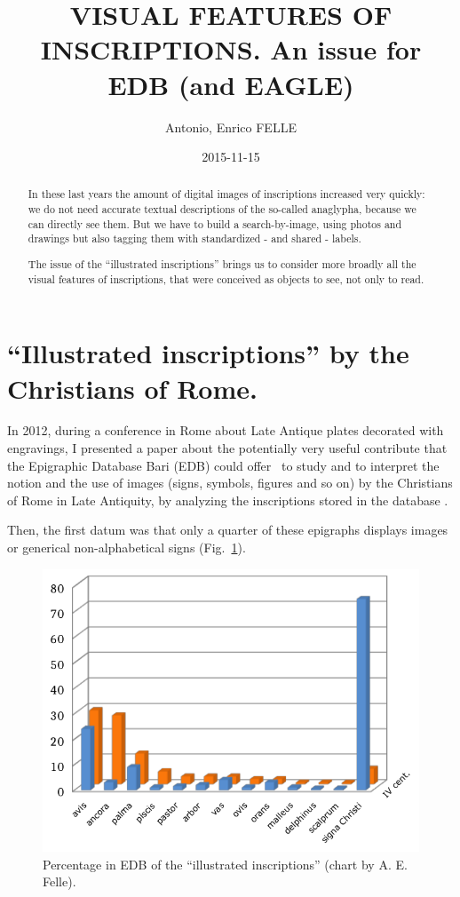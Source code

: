 \documentclass[amsthm,ebook]{saparticle}
\title{VISUAL FEATURES OF INSCRIPTIONS. An issue for EDB (and EAGLE)}
\author[uniba]{Antonio, Enrico FELLE\corref{first}}
\date{2015-11-15}
\begin{document}
\maketitle
\begin{abstract}
In these last years the amount of digital images of inscriptions increased very quickly: we do not need accurate textual
descriptions of the so-called anaglypha, because we can directly see them. But we have to build a search-by-image,
using photos and drawings but also tagging them with standardized - and shared - labels. 

The issue of the ``illustrated inscriptions'' brings us to consider more broadly all the
visual features of inscriptions, that were conceived as objects to see, not only to read.
\end{abstract}




\section{``Illustrated inscriptions'' by the Christians of Rome.}
\noindent In 2012, during a conference in Rome about Late Antique plates decorated with engravings, I presented a paper about the
potentially very useful contribute that the Epigraphic Database Bari (EDB) could offer \ to study and to interpret the
notion and the use of images (signs, symbols, figures and so on) by the Christians of Rome in Late Antiquity, by
analyzing the inscriptions stored in the database \citep{felle_apporto_2013}. 

Then, the first datum was that only a quarter of these epigraphs displays images or generical non-alphabetical signs
\citep[101]{felle_apporto_2013} (Fig.~\ref{fig:1}).

\begin{figure}[!bp]
\centering
 \includegraphics[width=\columnwidth]{FelleVisualFeaturesofinscriptionsEAGLE2016FullPaper-img001.pdf}
\caption{Percentage in EDB of the ``illustrated inscriptions'' (chart by A. E. Felle).}
\label{fig:1}
\end{figure}
\end{document}
